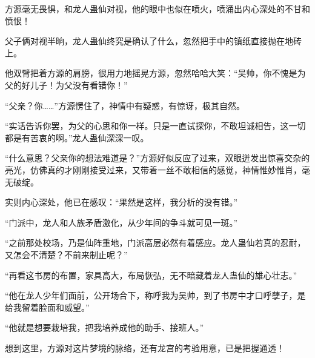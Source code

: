 \begin{this_body}
方源毫无畏惧，和龙人蛊仙对视，他的眼中也似在喷火，喷涌出内心深处的不甘和愤恨！

父子俩对视半晌，龙人蛊仙终究是确认了什么，忽然把手中的镇纸直接抛在地砖上。

他双臂把着方源的肩膀，很用力地摇晃方源，忽然哈哈大笑：“吴帅，你不愧是为父的好儿子！为父没有看错你！”

“父亲？你……”方源愣住了，神情中有疑惑，有惊讶，极其自然。

“实话告诉你罢，为父的心思和你一样。只是一直试探你，不敢坦诚相告，这一切都是有苦衷的啊。”龙人蛊仙深深一叹。

“什么意思？父亲你的想法难道是？”方源好似反应了过来，双眼迸发出惊喜交杂的亮光，仿佛真的才刚刚接受过来，又带着一丝不敢相信的感觉，神情惟妙惟肖，毫无破绽。

实则内心深处，他已在感叹：“果然是这样，我分析的没有错。”

“门派中，龙人和人族矛盾激化，从少年间的争斗就可见一斑。”

“之前那处校场，乃是仙阵重地，门派高层必然有着感应。龙人蛊仙若真的忍耐，又怎会不清楚？不前来制止呢？”

“再看这书房的布置，家具高大，布局恢弘，无不暗藏着龙人蛊仙的雄心壮志。”

“他在龙人少年们面前，公开场合下，称呼我为吴帅，到了书房中才口呼孽子，是给我留着脸面和威望。”

“他就是想要栽培我，把我培养成他的助手、接班人。”

想到这里，方源对这片梦境的脉络，还有龙宫的考验用意，已是把握通透！

\end{this_body}

